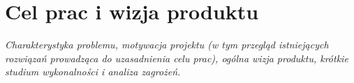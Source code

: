 \section{Cel prac i wizja produktu}
\label{sec:cel-wizja}

\emph{Charakterystyka problemu, motywacja projektu (w tym przegląd
  istniejących rozwiązań prowadząca do uzasadnienia celu prac), ogólna
  wizja produktu, krótkie studium wykonalności i analiza zagrożeń.}


\newpage